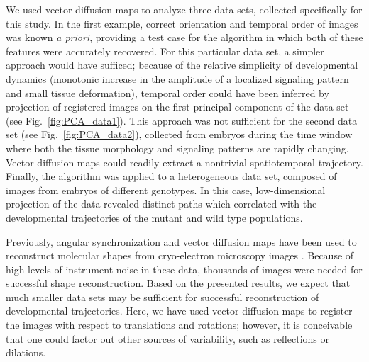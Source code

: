 \documentclass{pnastwo}
\newcommand{\fig}[0]{Fig.}
\begin{document}
\begin{article}
We used vector diffusion maps to analyze three data sets, collected specifically for this study. 
%
In the first example, correct orientation and temporal order of images was known {\it a priori}, providing a test case for the algorithm in which both of these features were accurately recovered. 
%
For this particular data set, a simpler approach would have sufficed;
because of the relative simplicity of developmental dynamics (monotonic increase in the amplitude of a localized signaling pattern and small tissue deformation), temporal order could have been inferred by projection of registered images on the first principal component of the data set (see \fig~\ref{fig:PCA_data1}). 
%
This approach was not sufficient for the second data set (see \fig~\ref{fig:PCA_data2}), collected from embryos during the time window where both the tissue morphology and signaling patterns are rapidly changing.  
%
Vector diffusion maps could readily extract a nontrivial spatiotemporal trajectory. 
%
Finally, the algorithm was applied to a heterogeneous data set, composed of images from embryos of different genotypes. 
%
In this case, low-dimensional projection of the data revealed distinct paths which correlated with the developmental trajectories of the mutant and wild type populations. 

Previously, angular synchronization and vector diffusion maps have been used to reconstruct molecular shapes from cryo-electron microscopy images \cite{singer2012vector, zhao2014rotationally, singer2011viewing}.
%
Because of high levels of instrument noise in these data, thousands of images were needed for successful shape reconstruction. 
%
Based on the presented results, we expect that much smaller data sets may be sufficient for successful reconstruction of developmental trajectories. 
%
Here, we have used vector diffusion maps to register the images with respect to translations and rotations; however, it is conceivable that one could factor out other sources of variability, such as reflections \cite{singer2012vector, goemans1995improved, bandeira2013cheeger} or dilations.


\end{article}
\end{document}
